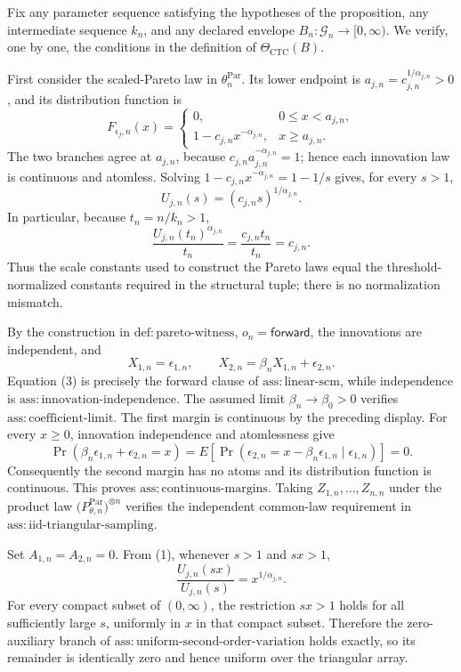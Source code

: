 Fix any parameter sequence satisfying the hypotheses of the proposition, any intermediate sequence \(k_n\), and any declared envelope \(B_n:\mathcal G_n\to[0,\infty)\).  We verify, one by one, the conditions in the definition of \(\Theta_{\mathrm{CTC}}(B)\).

First consider the scaled-Pareto law in \(\theta_n^{\mathrm{Par}}\).  Its lower endpoint is \(a_{j,n}=c_{j,n}^{1/\alpha_{j,n}}>0\), and its distribution function is
\[
 F_{\epsilon_j,n}(x)=
 \begin{cases}
 0,&0\leq x<a_{j,n},\\
 1-c_{j,n}x^{-\alpha_{j,n}},&x\geq a_{j,n}.
 \end{cases}
\]
The two branches agree at \(a_{j,n}\), because \(c_{j,n}a_{j,n}^{-\alpha_{j,n}}=1\); hence each innovation law is continuous and atomless.  Solving
\(1-c_{j,n}x^{-\alpha_{j,n}}=1-1/s\) gives, for every \(s>1\),
\[
 U_{j,n}(s)=(c_{j,n}s)^{1/\alpha_{j,n}}. \tag{1}
\]
In particular, because \(t_n=n/k_n>1\),
\[
 \frac{U_{j,n}(t_n)^{\alpha_{j,n}}}{t_n}
 =\frac{c_{j,n}t_n}{t_n}=c_{j,n}. \tag{2}
\]
Thus the scale constants used to construct the Pareto laws equal the threshold-normalized constants required in the structural tuple; there is no normalization mismatch.

By the construction in \(\mathrm{def:pareto\text{-}witness}\), \(o_n=\mathsf{forward}\), the innovations are independent, and
\[
 X_{1,n}=\epsilon_{1,n},\qquad
 X_{2,n}=\beta_nX_{1,n}+\epsilon_{2,n}. \tag{3}
\]
Equation (3) is precisely the forward clause of \(\mathrm{ass:linear\text{-}scm}\), while independence is \(\mathrm{ass:innovation\text{-}independence}\).  The assumed limit \(\beta_n\to\beta_0>0\) verifies \(\mathrm{ass:coefficient\text{-}limit}\).  The first margin is continuous by the preceding display.  For every \(x\geq0\), innovation independence and atomlessness give
\[
 \Pr\!\left(\beta_n\epsilon_{1,n}+\epsilon_{2,n}=x\right)
 =E\!\left[\Pr\!\left(\epsilon_{2,n}=x-\beta_n\epsilon_{1,n}\mid\epsilon_{1,n}\right)\right]=0. \tag{4}
\]
Consequently the second margin has no atoms and its distribution function is continuous.  This proves \(\mathrm{ass:continuous\text{-}margins}\).  Taking \(Z_{1,n},\ldots,Z_{n,n}\) under the product law \(\bigl(P_{\theta,n}^{\mathrm{Par}}\bigr)^{\otimes n}\) verifies the independent common-law requirement in \(\mathrm{ass:iid\text{-}triangular\text{-}sampling}\).

Set \(A_{1,n}=A_{2,n}=0\).  From (1), whenever \(s>1\) and \(sx>1\),
\[
 \frac{U_{j,n}(sx)}{U_{j,n}(s)}=x^{1/\alpha_{j,n}}. \tag{5}
\]
For every compact subset of \((0,\infty)\), the restriction \(sx>1\) holds for all sufficiently large \(s\), uniformly in \(x\) in that compact subset.  Therefore the zero-auxiliary branch of \(\mathrm{ass:uniform\text{-}second\text{-}order\text{-}variation}\) holds exactly, so its remainder is identically zero and hence uniform over the triangular array.

